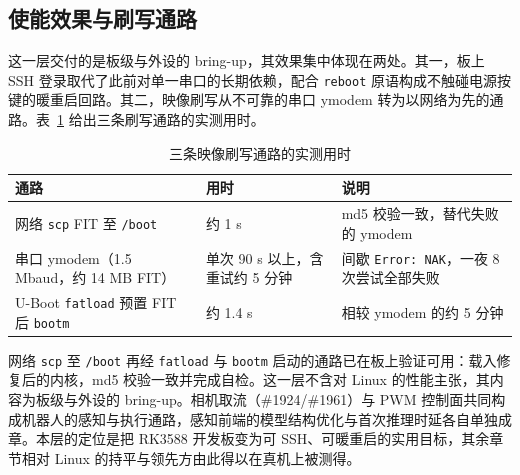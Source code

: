 \subsection{使能效果与刷写通路}

这一层交付的是板级与外设的 bring-up，其效果集中体现在两处。其一，板上 SSH 登录取代了此前对单一串口的长期依赖，配合 \texttt{reboot} 原语构成不触碰电源按键的暖重启回路。其二，映像刷写从不可靠的串口 ymodem 转为以网络为先的通路。表~\ref{tab:board-flash} 给出三条刷写通路的实测用时。

\begin{table}[htbp]\centering
\caption{三条映像刷写通路的实测用时}\label{tab:board-flash}
\begin{tabular}{@{}p{4.6cm}p{2.6cm}p{6.2cm}@{}}
\toprule
通路 & 用时 & 说明 \\
\midrule
网络 \texttt{scp} FIT 至 \texttt{/boot} & 约 1 s & md5 校验一致，替代失败的 ymodem \\
串口 ymodem（1.5 Mbaud，约 14 MB FIT） & 单次 90 s 以上，含重试约 5 分钟 & 间歇 \texttt{Error: NAK}，一夜 8 次尝试全部失败 \\
U-Boot \texttt{fatload} 预置 FIT 后 \texttt{bootm} & 约 1.4 s & 相较 ymodem 的约 5 分钟 \\
\bottomrule
\end{tabular}
\end{table}

网络 \texttt{scp} 至 \texttt{/boot} 再经 \texttt{fatload} 与 \texttt{bootm} 启动的通路已在板上验证可用：载入修复后的内核，md5 校验一致并完成自检。这一层不含对 Linux 的性能主张，其内容为板级与外设的 bring-up。相机取流（\#1924/\#1961）与 PWM 控制面共同构成机器人的感知与执行通路，感知前端的模型结构优化与首次推理时延各自单独成章。本层的定位是把 RK3588 开发板变为可 SSH、可暖重启的实用目标，其余章节相对 Linux 的持平与领先方由此得以在真机上被测得。
